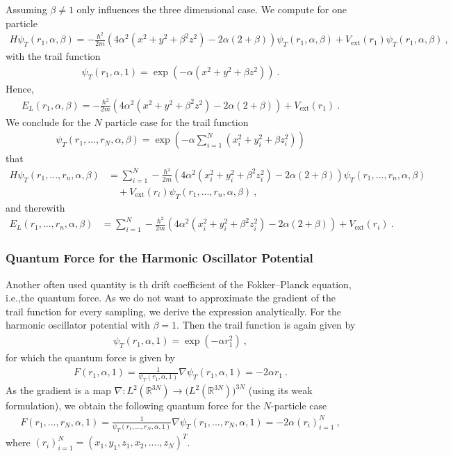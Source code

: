 \documentclass[11pt,a4paper]{article}
\numberwithin{equation}{section}
\begin{document}
Assuming $\beta\neq 1 $ only influences the three dimensional case. 
%
We compute for one particle
\begin{align*}
H \psi_T(r_1,\alpha,\beta)
=
-\frac{\hbar^2}{2m}\left(4\alpha^2(x^2+y^2+\beta^2z^2)-2\alpha (2+\beta)\right)\psi_T(r_1,\alpha,\beta)+V_{\mathrm{ext}}(r_1)\psi_T(r_1,\alpha,\beta)~,
\end{align*}
with the trail function
\begin{align*}
\psi_T(r_1,\alpha,1) = \exp(-\alpha (x^2+y^2+\beta z^2))~.
\end{align*}
Hence,
\begin{align*}
E_{L}(r_1,\alpha,\beta)
=
-\frac{\hbar^2}{2m}\left(4\alpha^2(x^2+y^2+\beta^2z^2)-2\alpha (2+\beta)\right)+V_{\mathrm{ext}}(r_1)~.
\end{align*}
We conclude for the $N$ particle case for the trail function
\begin{align*}
\psi_T(r_1,...,r_N,\alpha,\beta) = \exp(-\alpha \sum_{i=1}^{N}(x_i^2+y_i^2+\beta z_i^2))
\end{align*}
that
\begin{align*}
H \psi_T(r_1,...,r_n,\alpha,\beta)
&=
\sum_{i=1}^N-\frac{\hbar^2}{2m}\left(4\alpha^2(x_i^2+y_i^2+\beta^2z_i^2)-2\alpha (2+\beta)\right)\psi_T(r_1,...,r_n,\alpha,\beta)\\
&\quad +V_{\mathrm{ext}}(r_i)\psi_T(r_1,...,r_n,\alpha,\beta)~,
\end{align*}
and therewith
\begin{align*}
E_L(r_1,...,r_n,\alpha,\beta)
&=
\sum_{i=1}^N-\frac{\hbar^2}{2m}\left(4\alpha^2(x_i^2+y_i^2+\beta^2z_i^2)-2\alpha (2+\beta)\right)+V_{\mathrm{ext}}(r_i)~.
\end{align*}

\subsubsection{Quantum Force for the Harmonic Oscillator Potential}
%
%
Another often used quantity is th drift coefficient of the Fokker--Planck equation, i.e.,the quantum force. 
%
As we do not want to approximate the gradient of the trail function for every sampling, we derive the expression analytically.
%
For the harmonic oscillator potential with $\beta =1$.
%
Then the trail function is again given by    
\begin{align*}
\psi_T(r_1,\alpha,1) = \exp(-\alpha r_1^2)~,
\end{align*}
for which the quantum force is given by
\begin{align*}
F(r_1,\alpha,1) = \frac{1}{\psi_T(r_1,\alpha,1)}\nabla \psi_T(r_1,\alpha,1)
=
-2\alpha r_1~.
\end{align*}
As the gradient is a map $\nabla:L^2(\mathbb{R}^{3N})\to \big(L^2(\mathbb{R}^{3N})\big)^{3N}$ (using its weak formulation), we obtain the following quantum force for the $N$-particle case
\begin{align*}
F(r_1,...,r_N,\alpha,1) = \frac{1}{\psi_T(r_1,...,r_N,\alpha,1)}\nabla \psi_T(r_1,...,r_N,\alpha,1)
=
-2\alpha (r_i)_{i=1}^N~,
\end{align*}
where $(r_i)_{i=1}^N = (x_1, y_1 , z_1, x_2,...., z_N)^T$.
\end{document}
